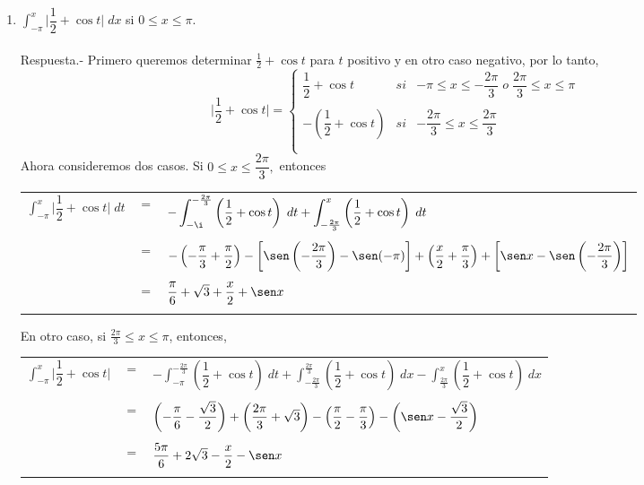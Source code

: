 \begin{enumerate}
\item $\displaystyle\int_{-\pi}^x \bigg|\dfrac{1}{2}+\cos t\bigg|\; dx$ si $0\leq x \leq \pi$.\\\\
    Respuesta.-\; Primero queremos determinar $\frac{1}{2}+\cos t$ para $t$ positivo y en otro caso negativo, por lo tanto,
    $$\bigg| \dfrac{1}{2}+\cos t \bigg| = \left\{\begin{array}{rcl}
	    \dfrac{1}{2}+\cos t&si&-\pi\leq x \leq -\dfrac{2\pi}{3}\; o \; \dfrac{2\pi}{3}\leq x \leq \pi\\\\
	    -\left(\dfrac{1}{2}+\cos t\right)&si&-\dfrac{2\pi}{3}\leq x \leq \dfrac{2\pi}{3}\\\\
    \end{array}\right.$$
    Ahora consideremos dos casos. Si $0\leq x \leq \dfrac{2\pi}{3},$ entonces 
    \begin{center}
	\begin{tabular}{rcl}
	    $\displaystyle\int_{-\pi}^x \bigg|\dfrac{1}{2}+\cos t\bigg|\; dt$&$=$&$-\displaystyle\int_{-\i}^{-\frac{2\pi}{3}}\left(\dfrac{1}{2}+\cos t\right)\; dt + \int_{-\frac{2\pi}{3}}^x \left(\dfrac{1}{2}+\cos t\right)\; dt$\\\\ &$=$&$-\left(-\dfrac{\pi}{3}+\dfrac{\pi}{2}\right)-\left[\sen\left(-\dfrac{2\pi}{3}\right)-\sen(-\pi)\right]+\left(\dfrac{x}{2}+\dfrac{\pi}{3}\right)+\left[\sen x - \sen \left(-\dfrac{2\pi}{3}\right)\right]$\\\\
									     &$=$&$\dfrac{\pi}{6}+\sqrt{3}+\dfrac{x}{2}+\sen x$\\\\
	\end{tabular}
    \end{center}

    En otro caso, si $\frac{2\pi}{3}\leq x \leq \pi$, entonces, 
    \begin{center}
	\begin{tabular}{rcl}
	    $\displaystyle\int_{-\pi}^{x} \bigg|\dfrac{1}{2}+\cos t\bigg|$&$=$&$-\displaystyle\int_{-\pi}^{-\frac{2\pi}{3}}\left(\dfrac{1}{2}+\cos t\right)\; dt + \int_{-\frac{2\pi}{3}}^{\frac{2\pi}{3}}\left(\dfrac{1}{2}+\cos t\right)\; dx - \int_{\frac{2\pi}{3}}^x \left(\dfrac{1}{2}+\cos t\right)\; dx$\\\\
									  &$=$&$\left(-\dfrac{\pi}{6}-\dfrac{\sqrt{3}}{2}\right)+\left(\dfrac{2\pi}{3}+\sqrt{3}\right)-\left(\dfrac{\pi}{2}-\dfrac{\pi}{3}\right)-\left(\sen x - \dfrac{\sqrt{3}}{2}\right)$\\\\
									  &$=$&$\dfrac{5\pi}{6}+2\sqrt{3} - \dfrac{x}{2}-\sen x$\\\\
	\end{tabular}
    \end{center}


\end{enumerate}
